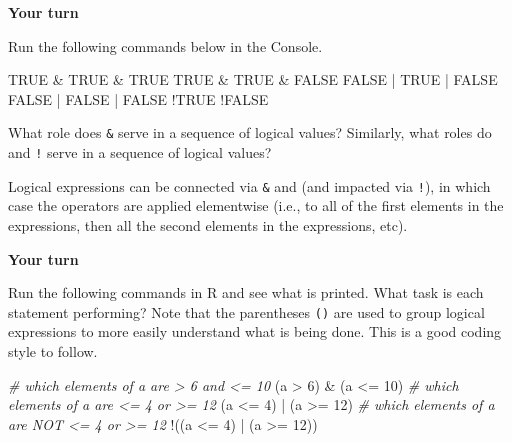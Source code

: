 \documentclass[
]{book}
\newenvironment{Shaded}{\begin{snugshade}}{\end{snugshade}}
\newcommand{\CommentTok}[1]{\textcolor[rgb]{0.56,0.35,0.01}{\textit{#1}}}
\newcommand{\ConstantTok}[1]{\textcolor[rgb]{0.00,0.00,0.00}{#1}}
\newcommand{\DecValTok}[1]{\textcolor[rgb]{0.00,0.00,0.81}{#1}}
\newcommand{\NormalTok}[1]{#1}
\newcommand{\SpecialCharTok}[1]{\textcolor[rgb]{0.00,0.00,0.00}{#1}}
\theoremstyle{definition}
\theoremstyle{definition}
\theoremstyle{definition}
\theoremstyle{definition}
\theoremstyle{remark}
\begin{document}
\begin{yourturn}
\textbf{Your turn}

Run the following commands below in the Console.

\begin{Shaded}
\begin{Highlighting}[]
\ConstantTok{TRUE} \SpecialCharTok{\&} \ConstantTok{TRUE} \SpecialCharTok{\&} \ConstantTok{TRUE}
\ConstantTok{TRUE} \SpecialCharTok{\&} \ConstantTok{TRUE} \SpecialCharTok{\&} \ConstantTok{FALSE}
\ConstantTok{FALSE} \SpecialCharTok{|} \ConstantTok{TRUE} \SpecialCharTok{|} \ConstantTok{FALSE}
\ConstantTok{FALSE} \SpecialCharTok{|} \ConstantTok{FALSE} \SpecialCharTok{|} \ConstantTok{FALSE}
\SpecialCharTok{!}\ConstantTok{TRUE}
\SpecialCharTok{!}\ConstantTok{FALSE}
\end{Highlighting}
\end{Shaded}

What role does \texttt{\&} serve in a sequence of logical values? Similarly, what roles do \texttt{\textbar{}} and \texttt{!} serve in a sequence of logical values?

\end{yourturn}

Logical expressions can be connected via \texttt{\&} and \texttt{\textbar{}} (and impacted via \texttt{!}), in which case the operators are applied elementwise (i.e., to all of the first elements in the expressions, then all the second elements in the expressions, etc).

\begin{yourturn}

\textbf{Your turn}

Run the following commands in R and see what is printed. What task is each statement performing? Note that the parentheses \texttt{()} are used to group logical expressions to more easily understand what is being done. This is a good coding style to follow.

\begin{Shaded}
\begin{Highlighting}[]
\CommentTok{\# which elements of a are \textgreater{} 6 and \textless{}= 10}
\NormalTok{(a }\SpecialCharTok{\textgreater{}} \DecValTok{6}\NormalTok{) }\SpecialCharTok{\&}\NormalTok{ (a }\SpecialCharTok{\textless{}=} \DecValTok{10}\NormalTok{)}
\CommentTok{\# which elements of a are \textless{}= 4 or \textgreater{}= 12}
\NormalTok{(a }\SpecialCharTok{\textless{}=} \DecValTok{4}\NormalTok{) }\SpecialCharTok{|}\NormalTok{ (a }\SpecialCharTok{\textgreater{}=} \DecValTok{12}\NormalTok{)}
\CommentTok{\# which elements of a are NOT \textless{}= 4 or \textgreater{}= 12}
\SpecialCharTok{!}\NormalTok{((a }\SpecialCharTok{\textless{}=} \DecValTok{4}\NormalTok{) }\SpecialCharTok{|}\NormalTok{ (a }\SpecialCharTok{\textgreater{}=} \DecValTok{12}\NormalTok{))}
\end{Highlighting}
\end{Shaded}

\end{yourturn}
\end{document}
